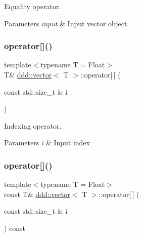 Equality operator. 


\begin{DoxyParams}{Parameters}
{\em input} & Input vector object \\
\hline
\end{DoxyParams}
\mbox{\label{classddd_1_1vector_a38e2123649fc4ebf839f22e5061b9497}} 
\subsubsection{\texorpdfstring{operator[]()}{operator[]()}\hspace{0.1cm}{\footnotesize\ttfamily [1/2]}}
{\footnotesize\ttfamily template$<$typename T = Float$>$ \\
T\& \hyperlink{classddd_1_1vector}{ddd\+::vector}$<$ T $>$\+::operator\mbox{[}$\,$\mbox{]} (\begin{DoxyParamCaption}\item[{const std\+::size\+\_\+t \&}]{i }\end{DoxyParamCaption})\hspace{0.3cm}{\ttfamily [inline]}}



Indexing operator. 


\begin{DoxyParams}{Parameters}
{\em i} & Input index \\
\hline
\end{DoxyParams}
\mbox{\label{classddd_1_1vector_a7e8d544a596450edb30914dcc21159fc}} 
\subsubsection{\texorpdfstring{operator[]()}{operator[]()}\hspace{0.1cm}{\footnotesize\ttfamily [2/2]}}
{\footnotesize\ttfamily template$<$typename T = Float$>$ \\
const T\& \hyperlink{classddd_1_1vector}{ddd\+::vector}$<$ T $>$\+::operator\mbox{[}$\,$\mbox{]} (\begin{DoxyParamCaption}\item[{const std\+::size\+\_\+t \&}]{i }\end{DoxyParamCaption}) const\hspace{0.3cm}{\ttfamily [inline]}}




